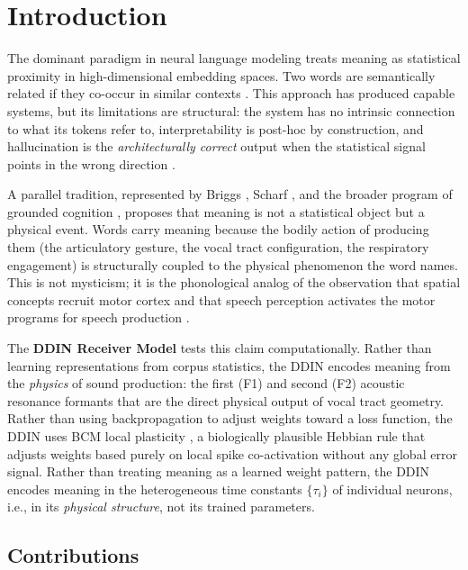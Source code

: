 \documentclass{article}
\begin{document}
\section{Introduction}

The dominant paradigm in neural language modeling treats meaning as statistical proximity in high-dimensional embedding spaces. Two words are semantically related if they co-occur in similar contexts \cite{mikolov2013, devlin2019}. This approach has produced capable systems, but its limitations are structural: the system has no intrinsic connection to what its tokens refer to, interpretability is post-hoc by construction, and hallucination is the \textit{architecturally correct} output when the statistical signal points in the wrong direction \cite{rudin2019}.

A parallel tradition, represented by Briggs \cite{briggs1985}, Scharf \cite{scharf2018}, and the broader program of grounded cognition \cite{lakoff1999, harnad1990}, proposes that meaning is not a statistical object but a physical event. Words carry meaning because the bodily action of producing them (the articulatory gesture, the vocal tract configuration, the respiratory engagement) is structurally coupled to the physical phenomenon the word names. This is not mysticism; it is the phonological analog of the observation that spatial concepts recruit motor cortex \cite{lakoff1999} and that speech perception activates the motor programs for speech production \cite{liberman1985}.

The \textbf{DDIN Receiver Model} tests this claim computationally. Rather than learning representations from corpus statistics, the DDIN encodes meaning from the \textit{physics} of sound production: the first (F1) and second (F2) acoustic resonance formants that are the direct physical output of vocal tract geometry. Rather than using backpropagation to adjust weights toward a loss function, the DDIN uses BCM local plasticity \cite{bienenstock1982}, a biologically plausible Hebbian rule that adjusts weights based purely on local spike co-activation without any global error signal. Rather than treating meaning as a learned weight pattern, the DDIN encodes meaning in the heterogeneous time constants $\{\tau_i\}$ of individual neurons, i.e., in its \textit{physical structure}, not its trained parameters.

\subsection{Contributions}
\end{document}
